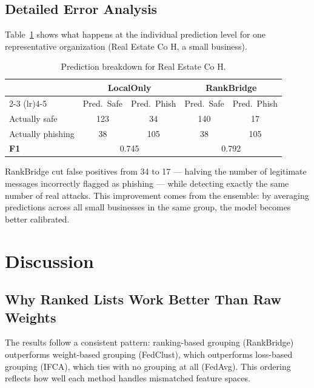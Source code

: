 \documentclass[12pt,a4paper]{article}
\begin{document}
\subsection{Detailed Error Analysis}

Table~\ref{tab:confusion} shows what happens at the individual prediction level for one representative organization (Real Estate Co H, a small business).

\begin{table}[H]
\centering
\caption{Prediction breakdown for Real Estate Co H.}\label{tab:confusion}
\begin{tabular}{lcccc}
\toprule
& \multicolumn{2}{c}{\textbf{LocalOnly}} & \multicolumn{2}{c}{\textbf{RankBridge}} \\
\cmidrule(lr){2-3} \cmidrule(lr){4-5}
& Pred.\ Safe & Pred.\ Phish & Pred.\ Safe & Pred.\ Phish \\
\midrule
Actually safe    & 123 & 34 & 140 & 17 \\
Actually phishing & 38  & 105 & 38  & 105 \\
\midrule
\textbf{F1}      & \multicolumn{2}{c}{0.745} & \multicolumn{2}{c}{0.792} \\
\bottomrule
\end{tabular}
\end{table}

RankBridge cut false positives from 34 to 17 --- halving the number of legitimate messages incorrectly flagged as phishing --- while detecting exactly the same number of real attacks. This improvement comes from the ensemble: by averaging predictions across all small businesses in the same group, the model becomes better calibrated.

\section{Discussion}\label{sec:discussion}

\subsection{Why Ranked Lists Work Better Than Raw Weights}

The results follow a consistent pattern: ranking-based grouping (RankBridge) outperforms weight-based grouping (FedClust), which outperforms loss-based grouping (IFCA), which ties with no grouping at all (FedAvg). This ordering reflects how well each method handles mismatched feature spaces.
\end{document}
